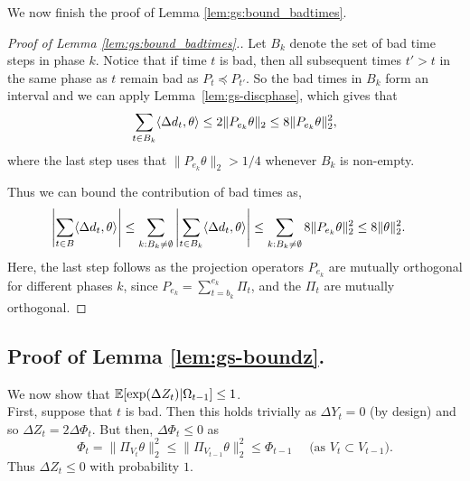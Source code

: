 We now finish the proof of Lemma \ref{lem:gs:bound_badtimes}.
\begin{proof}[Proof of \em Lemma \ref{lem:gs:bound_badtimes}.]
Let $B_k$ denote the set of bad time steps in phase $k$. Notice that if time $t$ is bad, then all subsequent times $t'>t$ in the same phase as $t$ remain bad as $P_t \preceq P_{t'}$. 
So the bad times in $B_k$ form an interval and we can apply Lemma~\ref{lem:gs-discphase}, which gives that  %
\[\sum_{t \in B_k} \langle \Delta d_t,\theta\rangle   \leq 2 \|P_{e_k} \theta\|_2  \leq 8 \|P_{e_k} \theta\|_2^2,\]
where the last step uses that $\|P_{e_k}\theta\|_2> 1/4$ whenever $B_k$ is non-empty.

Thus we can bound the contribution of bad times as,
\begin{align*}
  \left|\sum_{t \in B}  \langle \Delta d_t,\theta\rangle \right|
&  \leq \sum_{k: B_k \neq \emptyset} \left|\sum_{t \in B_k} \langle \Delta d_t,\theta\rangle \right| 
  \leq  \sum_{k:B_k\neq \emptyset} 8 \|P_{e_k} \theta\|_2^2
  \leq  8 \|\theta\|_2^2.
\end{align*}
Here, the last step follows as the projection operators $P_{e_k}$ are mutually orthogonal for different phases $k$, since $P_{e_k} =\sum_{t = b_k}^{e_k} \Pi_t$, and the $\Pi_t$ are mutually orthogonal.
\end{proof}


\subsection{Proof of Lemma \ref{lem:gs-boundz}.}
We now show that  $\mathbb{E}[\exp(\Delta Z_t)|\Omega_{t-1}] \leq 1$.\\%

First, suppose that $t$ is bad. Then this holds trivially as $\Delta Y_t =0$ (by design) and so $\Delta Z_t = 2\Delta \Phi_t$. But then, $\Delta \Phi_t \leq 0$ as 
\[\Phi_t = \|\Pi_{V_t} \theta\|_2^2 \leq \|\Pi_{V_{t-1}} \theta\|_2^2  \leq \Phi_{t-1} \quad \text{ (as $V_t \subset V_{t-1}$)}.\] Thus $\Delta Z_t \leq 0$ with probability $1$.\\

